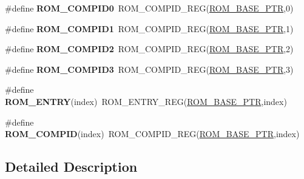 \begin{DoxyCompactItemize}
\item 
\mbox{\label{group___r_o_m___register___accessor___macros_gac5280f363861e1e1d7729b9ae03287b8}} 
\#define {\bfseries R\+O\+M\+\_\+\+C\+O\+M\+P\+I\+D0}~R\+O\+M\+\_\+\+C\+O\+M\+P\+I\+D\+\_\+\+R\+EG(\hyperlink{group___r_o_m___peripheral_ga5ad426d10b6832ca7012e8767113f686}{R\+O\+M\+\_\+\+B\+A\+S\+E\+\_\+\+P\+TR},0)
\item 
\mbox{\label{group___r_o_m___register___accessor___macros_ga28d5ee392b019886989316d12188ca0d}} 
\#define {\bfseries R\+O\+M\+\_\+\+C\+O\+M\+P\+I\+D1}~R\+O\+M\+\_\+\+C\+O\+M\+P\+I\+D\+\_\+\+R\+EG(\hyperlink{group___r_o_m___peripheral_ga5ad426d10b6832ca7012e8767113f686}{R\+O\+M\+\_\+\+B\+A\+S\+E\+\_\+\+P\+TR},1)
\item 
\mbox{\label{group___r_o_m___register___accessor___macros_ga3a7a24370ddc945268ab011f5ad36e8f}} 
\#define {\bfseries R\+O\+M\+\_\+\+C\+O\+M\+P\+I\+D2}~R\+O\+M\+\_\+\+C\+O\+M\+P\+I\+D\+\_\+\+R\+EG(\hyperlink{group___r_o_m___peripheral_ga5ad426d10b6832ca7012e8767113f686}{R\+O\+M\+\_\+\+B\+A\+S\+E\+\_\+\+P\+TR},2)
\item 
\mbox{\label{group___r_o_m___register___accessor___macros_ga7789fe9cc0215fcd4cae71f04764e9f7}} 
\#define {\bfseries R\+O\+M\+\_\+\+C\+O\+M\+P\+I\+D3}~R\+O\+M\+\_\+\+C\+O\+M\+P\+I\+D\+\_\+\+R\+EG(\hyperlink{group___r_o_m___peripheral_ga5ad426d10b6832ca7012e8767113f686}{R\+O\+M\+\_\+\+B\+A\+S\+E\+\_\+\+P\+TR},3)
\item 
\mbox{\label{group___r_o_m___register___accessor___macros_ga069404bc9c62c5e1e8dcd239e6abbfcc}} 
\#define {\bfseries R\+O\+M\+\_\+\+E\+N\+T\+RY}(index)~R\+O\+M\+\_\+\+E\+N\+T\+R\+Y\+\_\+\+R\+EG(\hyperlink{group___r_o_m___peripheral_ga5ad426d10b6832ca7012e8767113f686}{R\+O\+M\+\_\+\+B\+A\+S\+E\+\_\+\+P\+TR},index)
\item 
\mbox{\label{group___r_o_m___register___accessor___macros_ga6049b92e3274bd0d699e6009eb0a24a1}} 
\#define {\bfseries R\+O\+M\+\_\+\+C\+O\+M\+P\+ID}(index)~R\+O\+M\+\_\+\+C\+O\+M\+P\+I\+D\+\_\+\+R\+EG(\hyperlink{group___r_o_m___peripheral_ga5ad426d10b6832ca7012e8767113f686}{R\+O\+M\+\_\+\+B\+A\+S\+E\+\_\+\+P\+TR},index)
\end{DoxyCompactItemize}


\subsection{Detailed Description}
